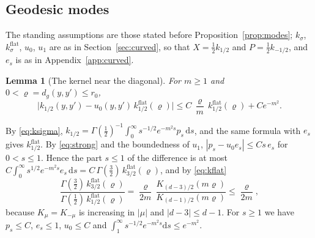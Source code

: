 \documentclass[11pt,a4paper]{article}
\makeatletter
\theoremstyle{stmt}
\newtheorem{lemma}[theorem]{Lemma}
\theoremstyle{defn}
\theoremstyle{rmk}
\renewenvironment{proof}[1][\proofname]{\par\pushQED{\qed}\normalfont\topsep6\p@\@plus6\p@\relax
  \trivlist\item[\hskip\labelsep{\sffamily\itshape\small #1.}]\ignorespaces}{\popQED\endtrivlist\@endpefalse}
\numberwithin{equation}{section}
\newcommand{\dd}{\mathrm{d}}
\makeatother
\begin{document}
\subsection{Geodesic modes}

The standing assumptions are those stated before Proposition~\ref{prop:modes}; $k_\sigma$, $k^{\mathrm{flat}}_\sigma$, $u_0$, $u_1$ are as in Section~\ref{sec:curved}, so that $X=\tfrac12k_{1/2}$ and $P=\tfrac12k_{-1/2}$, and $e_s$ is as in Appendix~\ref{app:curved}.

\begin{lemma}[The kernel near the diagonal]\label{lem:neardiag}
For $m\ge1$ and $0<\varrho=d_g(y,y')\le r_0$,
\[
\big|k_{1/2}(y,y')-u_0(y,y')\,k^{\mathrm{flat}}_{1/2}(\varrho)\big|\le C\,\frac\varrho m\,k^{\mathrm{flat}}_{1/2}(\varrho)+Ce^{-m^2}.
\]
\end{lemma}

\begin{proof}
By \eqref{eq:ksigma}, $k_{1/2}=\Gamma(\tfrac12)^{-1}\int_0^\infty s^{-1/2}e^{-m^2s}p_s\,\dd s$, and the same formula with $e_s$ gives $k^{\mathrm{flat}}_{1/2}$. By \eqref{eq:strong} and the boundedness of $u_1$, $|p_s-u_0e_s|\le Cs\,e_s$ for $0<s\le1$. Hence the part $s\le1$ of the difference is at most $C\int_0^\infty s^{1/2}e^{-m^2s}e_s\,\dd s=C\,\Gamma(\tfrac32)\,k^{\mathrm{flat}}_{3/2}(\varrho)$, and by \eqref{eq:kflat}
\[
\frac{\Gamma(\tfrac32)\,k^{\mathrm{flat}}_{3/2}(\varrho)}{\Gamma(\tfrac12)\,k^{\mathrm{flat}}_{1/2}(\varrho)}=\frac{\varrho}{2m}\,\frac{K_{(d-3)/2}(m\varrho)}{K_{(d-1)/2}(m\varrho)}\le\frac{\varrho}{2m},
\]
because $K_\mu=K_{-\mu}$ is increasing in $|\mu|$ and $|d-3|\le d-1$. For $s\ge1$ we have $p_s\le C$, $e_s\le1$, $u_0\le C$ and $\int_1^\infty s^{-1/2}e^{-m^2s}\dd s\le e^{-m^2}$.
\end{proof}
\end{document}
